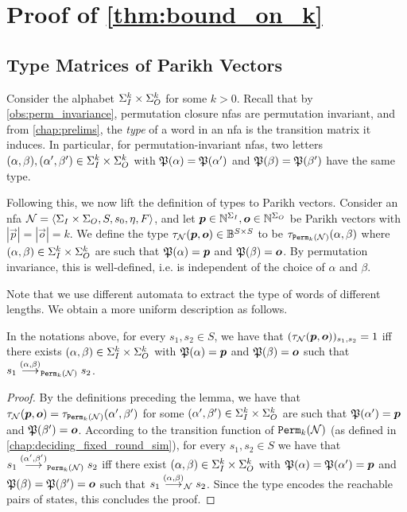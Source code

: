 \section{Proof of \autoref{thm:bound_on_k}}
\label{sec:proof_of_bound}
\subsection*{Type Matrices of Parikh Vectors}
Consider the alphabet $\Sigma_{I}^k\times \Sigma_{O}^k$ for some $k>0$.
Recall that by \autoref{obs:perm_invariance}, permutation closure \glspl{nfa} are permutation invariant, and from \autoref{chap:prelims}, the \emph{type} of a word in an \gls{nfa} is the transition matrix it induces.
In particular, for permutation-invariant \glspl{nfa}, two letters $(\alpha,\beta),(\alpha',\beta')\in \Sigma_{I}^k\times \Sigma_{O}^k$ with $\mathfrak{P}(\alpha)=\mathfrak{P}(\alpha')$ and $\mathfrak{P}(\beta)=\mathfrak{P}(\beta')$ have the same type.

Following this, we now lift the definition of types to Parikh vectors. Consider an \gls{nfa} $\mathcal{N}=\left< \Sigma_{I}\times \Sigma_{O},S,s_0,\eta,F\right>$, and let $\boldsymbol{p}\in \mathbb{N}^{\Sigma_{I}},\boldsymbol{o}\in \mathbb{N}^{\Sigma_{O}}$ be Parikh vectors with $|\vec{p}|=|\vec{o}|=k$. We define the type $\tau_{\mathcal{N}}(\boldsymbol{p},\boldsymbol{o})\in \mathbb{B}^{S\times S}$ to be $\tau_{{\mathtt{Perm}}_k(\mathcal{N})}(\alpha,\beta)$ where $(\alpha,\beta)\in \Sigma_{I}^k\times \Sigma_{O}^k$ are such that $\mathfrak{P}(\alpha)=\boldsymbol{p}$ and $\mathfrak{P}(\beta)=\boldsymbol{o}$. By permutation invariance, this is well-defined, i.e. is independent of the choice of $\alpha$ and $\beta$.

Note that we use different automata to extract the type of words of different lengths. We obtain a more uniform description as follows.
\begin{lemma}
\label{lem:type_of_parikh}
    In the notations above, for every $s_1,s_2\in S$, we have that $(\tau_{\mathcal{N}}(\boldsymbol{p},\boldsymbol{o}))_{s_1,s_2}=1$ iff there exists $(\alpha,\beta)\in \Sigma_{I}^k\times \Sigma_{O}^k$ with $\mathfrak{P}(\alpha)=\boldsymbol{p}$ and $\mathfrak{P}(\beta)=\boldsymbol{o}$ such that $s_1\stackrel{(\alpha,\beta)}{\longrightarrow}_{{\mathtt{Perm}}_k(\mathcal{N})}s_2$.
\end{lemma}
\begin{proof}
    By the definitions preceding the lemma, we have that $\tau_{\mathcal{N}}(\boldsymbol{p},\boldsymbol{o})=\tau_{{\mathtt{Perm}}_k(\mathcal{N})}(\alpha',\beta')$ for some $(\alpha',\beta')\in \Sigma_{I}^k\times \Sigma_{O}^k$ are such that $\mathfrak{P}(\alpha')=\boldsymbol{p}$ and $\mathfrak{P}(\beta')=\boldsymbol{o}$. According to the transition function of ${\mathtt{Perm}}_k(\mathcal{N})$ (as defined in \autoref{chap:deciding_fixed_round_sim}), for every $s_1,s_2\in S$ we have that $s_1\stackrel{(\alpha',\beta')}{\longrightarrow}_{{\mathtt{Perm}}_k(\mathcal{N})}s_2$ iff there exist $(\alpha,\beta)\in \Sigma_{I}^k\times \Sigma_{O}^k$ with $\mathfrak{P}(\alpha)=\mathfrak{P}(\alpha')=\boldsymbol{p}$ and $\mathfrak{P}(\beta)=\mathfrak{P}(\beta')=\boldsymbol{o}$ such that $s_1\stackrel{(\alpha,\beta)}{\longrightarrow}_{\mathcal{N}}s_2$. Since the type encodes the reachable pairs of states, this concludes the proof.
\end{proof}

